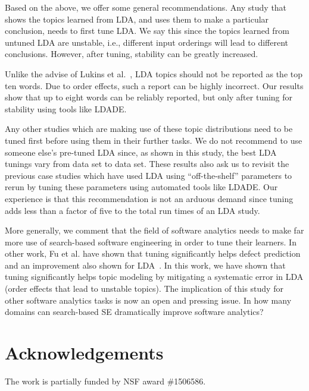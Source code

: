 \documentclass[twocolumn,5p,sort&compress]{elsarticle}
\theoremstyle{break}
\begin{document}
Based on the above, we offer some general recommendations. Any study that shows the topics learned from LDA, and uses them to make a particular
conclusion, needs to first tune LDA. We say this since the topics learned from untuned LDA are unstable, i.e., different input orderings will lead to different conclusions. However, after tuning, stability can be greatly increased.

Unlike the advise of Lukins et al.~\cite{lukins2010bug}, LDA topics should not be reported as the top ten words.
  Due to order effects, such a report can be highly incorrect.
  Our results show that up to eight words can be reliably reported, but only
  after tuning for stability using tools like LDADE.

Any other studies which are making use of these topic distributions need to be tuned first before using them in their further tasks. We do not recommend to use someone else's pre-tuned LDA since, as shown in this study,  the best LDA tunings vary from data set to data set. These results also ask us to revisit the previous case studies which have used LDA using ``off-the-shelf'' parameters to rerun by tuning these parameters using automated tools like LDADE. Our experience is that this recommendation is not an arduous demand since tuning adds less than a factor of five to the total run times of an LDA study.

More generally, we comment that the field of software analytics needs to make far more use of search-based software engineering in order
to tune their learners. In other work, Fu et al. have shown that tuning significantly helps defect prediction~\cite{fu2016tuning} and an improvement also shown for LDA~\cite{panichella2013effectively}. In this work, we have shown that tuning significantly helps topic modeling by mitigating a systematic error in LDA  (order effects that lead to unstable topics). The implication of this study for other software analytics tasks is now an open
and pressing issue. 
In how many domains can search-based SE dramatically improve software analytics?


\section*{Acknowledgements}
		The work is partially funded by NSF award \#1506586.
	
\balance

\medskip



\end{document}
